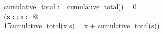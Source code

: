 \documentclass[a4paper,10pt,fleqn]{article}
\begin{document}
\begin{axdef}
cumulative\_total : \seq~\nat \fun \nat
\where
cumulative\_total(\langle \rangle) = 0 \land \\
\quad (\forall x : \nat; s : \seq~\nat @ \\
\t1 cumulative\_total(\langle x \rangle \cat s) = x + cumulative\_total(s))
\end{axdef}
\end{document}
